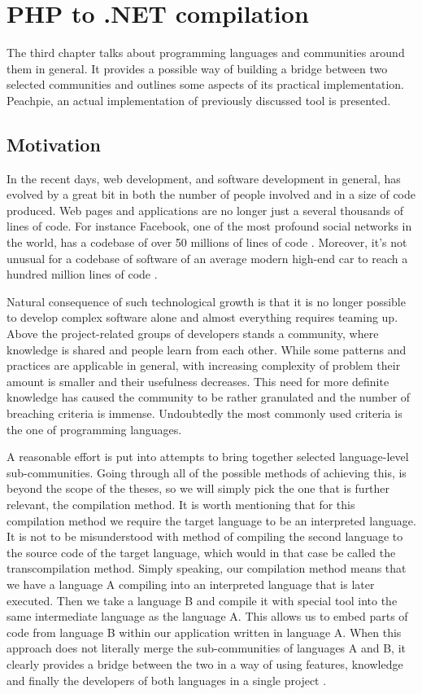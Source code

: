 \chapter{PHP to .NET compilation}
The third chapter talks about programming languages and communities around them in general. It provides a possible way of building a bridge between two selected communities and outlines some aspects of its practical implementation. Peachpie, an actual implementation of previously discussed tool is presented.

\section{Motivation}
In the recent days, web development, and software development in general, has evolved by a great bit in both the number of people involved and in a size of code produced. Web pages and applications are no longer just a several thousands of lines of code. For instance Facebook, one of the most profound social networks in the world, has a codebase of over 50 millions of lines of code \citep{Knowledge}. Moreover, it's not unusual for a codebase of software of an average modern high-end car to reach a hundred million lines of code \citep{Knowledge}. 

Natural consequence of such technological growth is that it is no longer possible to develop complex software alone and almost everything requires teaming up. Above the project-related groups of developers stands a community, where knowledge is shared and people learn from each other. While some patterns and practices are applicable in general, with increasing complexity of problem their amount is smaller and their usefulness decreases. This need for more definite knowledge has caused the community to be rather granulated and the number of breaching criteria is immense. Undoubtedly the most commonly used criteria is the one of programming languages.

A reasonable effort is put into attempts to bring together selected language-level sub-communities. Going through all of the possible methods of achieving this, is beyond the scope of the theses, so we will simply pick the one that is further relevant, the compilation method. It is worth mentioning that for this compilation method we require the target language to be an interpreted language. It is not to be misunderstood with method of compiling the second language to the source code of the target language, which would in that case be called the transcompilation method. Simply speaking, our compilation method means that we have a language A compiling into an interpreted language that is later executed. Then we take a language B and compile it with special tool into the same intermediate language as the language A. This allows us to embed parts of code from language B within our application written in language A. When this approach does not literally merge the sub-communities of languages A and B, it clearly provides a bridge between the two in a way of using features, knowledge and finally the developers of both languages in a single project \citep{Peachpie}.

